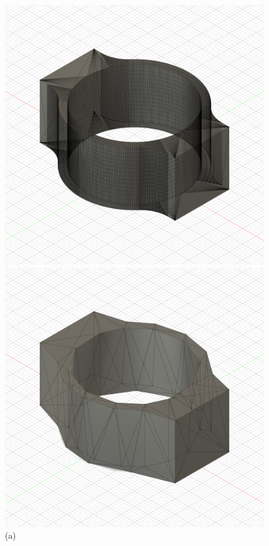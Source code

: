 \begin{figure}[h]
    \centering
    \begin{minipage}{0.32\textwidth}
        \centering
        \includegraphics[width=\linewidth]{images/image_demo.PNG} %
        \caption*{(a)}
    \end{minipage}\hfill
    \begin{minipage}{0.32\textwidth}
        \centering
        \includegraphics[width=\linewidth]{images/image_demo_medium.PNG} %

\end{minipage}
\end{figure}
